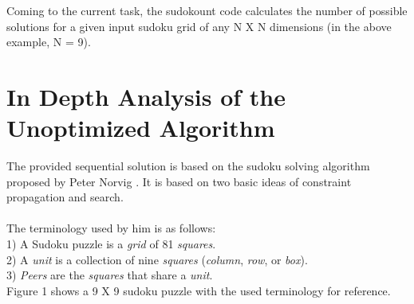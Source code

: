 \documentclass[a4paper,10pt,twoside]{article}
\begin{document}
Coming to the current task, the sudokount code calculates the number of possible solutions for a given input sudoku grid of any N X N dimensions (in the above example, N = 9). 

\section{In Depth Analysis of the Unoptimized Algorithm}
The provided sequential solution is based on the sudoku solving algorithm proposed by Peter Norvig \cite{norvig}. It is based on two basic ideas of constraint propagation and search.\\ \\
The terminology used by him is as follows:\\
1) A Sudoku puzzle is a \textit{grid} of 81 \textit{squares}.\\
2) A \textit{unit} is a collection of nine \textit{squares} (\textit{column}, \textit{row}, or \textit{box}).\\
3) \textit{Peers} are the \textit{squares} that share a \textit{unit}.\\
Figure 1 shows a 9 X 9 sudoku puzzle  with the used terminology for reference.\\ \\
\end{document}

